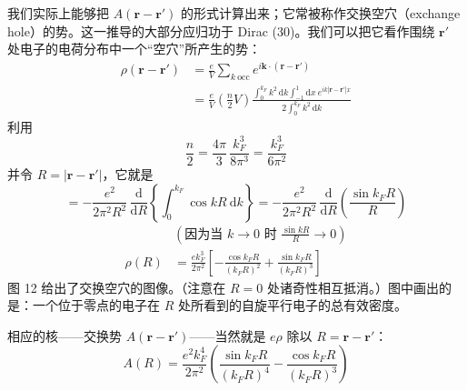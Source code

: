 我们实际上能够把 $A(\mathbf{r}-\mathbf{r}')$ 的形式计算出来；它常被称作交换空穴（exchange hole）的势。这一推导的大部分应归功于 Dirac (30)。我们可以把它看作围绕 $\mathbf{r}'$ 处电子的电荷分布中一个“空穴”所产生的势：
\begin{align*}
\rho(\mathbf{r}-\mathbf{r}') &= \frac{e}{V}\sum_{k\ \mathrm{occ}} e^{i\mathbf{k}\cdot(\mathbf{r}-\mathbf{r}')}\\
&= \frac{e}{V}\left(\frac{n}{2}V\right) \frac{\displaystyle \int_0^{k_F} k^2\,\mathrm{d}k \int_{-1}^{1}\mathrm{d}x\ e^{ik|\mathbf{r}-\mathbf{r}'|x}}{\displaystyle 2\int_0^{k_F} k^2\,\mathrm{d}k}
\end{align*}
利用
\begin{equation*}
\frac{n}{2} = \frac{4\pi}{3}\,\frac{k_F^3}{8\pi^3} = \frac{k_F^3}{6\pi^2}
\end{equation*}
并令 $R = |\mathbf{r}-\mathbf{r}'|$，它就是
\begin{equation*}
= -\frac{e^2}{2\pi^2 R^2}\,\frac{\mathrm{d}}{\mathrm{d}R}\left\{\int_0^{k_F} \cos kR\ \mathrm{d}k\right\} = -\frac{e^2}{2\pi^2 R^2}\,\frac{\mathrm{d}}{\mathrm{d}R}\left(\frac{\sin k_F R}{R}\right)
\end{equation*}
\begin{align*}
&\left(\text{因为当 } k \to 0 \text{ 时 } \frac{\sin kR}{R} \to 0\right)\\
\rho(R) &= \frac{e k_F^3}{2\pi^2}\left[-\frac{\cos k_F R}{(k_F R)^2} + \frac{\sin k_F R}{(k_F R)^3}\right]
\end{align*}
图 12 给出了交换空穴的图像。（注意在 $R = 0$ 处诸奇性相互抵消。）图中画出的是：一个位于零点的电子在 $R$ 处所看到的自旋平行电子的总有效密度。


相应的核——交换势 $A(\mathbf{r}-\mathbf{r}')$——当然就是 $e\rho$ 除以 $R = \mathbf{r}-\mathbf{r}'$：
\begin{equation*}
A(R) = \frac{e^2 k_F^4}{2\pi^2}\left(\frac{\sin k_F R}{(k_F R)^4} - \frac{\cos k_F R}{(k_F R)^3}\right)
\end{equation*}

